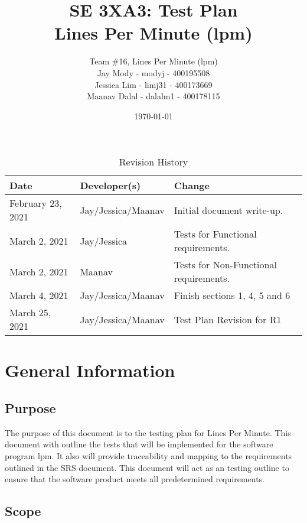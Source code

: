 \documentclass[12pt, titlepage]{article}
\title{\textbf{SE 3XA3: Test Plan}\\Lines Per Minute (lpm)}
\author{Team \#16, Lines Per Minute (lpm)\\
Jay Mody - modyj - 400195508\\
Jessica Lim - limj31 - 400173669\\
Maanav Dalal - dalalm1 - 400178115\\
}
\date{\today}
\begin{document}
\maketitle
\begin{table}[hp]
\caption{Revision History} \label{TblRevisionHistory}
\begin{tabularx}{\textwidth}{llX}
\toprule
\textbf{Date} & \textbf{Developer(s)} & \textbf{Change}\\
\midrule
February 23, 2021 & Jay/Jessica/Maanav & Initial document write-up. \\
March 2, 2021 & Jay/Jessica & Tests for Functional requirements. \\
March 2, 2021 & Maanav & Tests for Non-Functional requirements. \\
March 4, 2021 & Jay/Jessica/Maanav & Finish sections 1, 4, 5 and 6 \\
March 25, 2021 & Jay/Jessica/Maanav & Test Plan Revision for R1 \\
\bottomrule
\end{tabularx}
\end{table}

\newpage

\maketitle

\tableofcontents
\listoftables

\newpage


\section{General Information}

\subsection{Purpose}

The purpose of this document is to the testing plan for Lines Per Minute. This document with outline the tests that will be implemented for the software program lpm. It also will provide traceability and mapping to the requirements outlined in the SRS document. This document will act as an testing outline to ensure that the software product meets all predetermined requirements.

\subsection{Scope}
\end{document}
